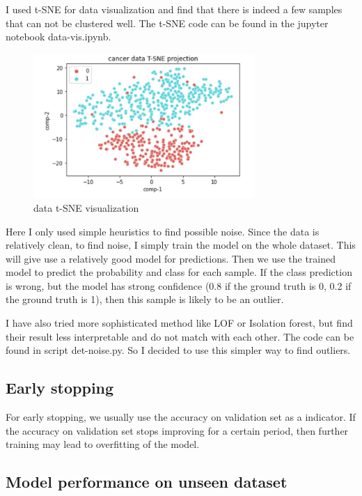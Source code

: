 \documentclass[a4paper, 12pt]{article}
\begin{document}
I used t-SNE for data visualization and find that there is indeed a few samples that can not be clustered well.
The t-SNE code can be found in the jupyter notebook data-vis.ipynb.

\begin{figure}[h]
    \centering
    \includegraphics[width=0.75\textwidth]{data-tsne.jpg}
    \caption{data t-SNE visualization}
\end{figure}

Here I only used simple heuristics to find possible noise.
Since the data is relatively clean, to find noise, I simply train the model on the whole dataset.
This will give use a relatively good model for predictions.
Then we use the trained model to predict the probability and class for each sample.
If the class prediction is wrong, but the model has strong confidence
(0.8 if the ground truth is 0, 0.2 if the ground truth is 1),
then this sample is likely to be an outlier.

I have also tried more sophisticated method like LOF or Isolation forest, but find their result less
interpretable and do not match with each other. The code can be found in script det-noise.py.
So I decided to use this simpler way to find outliers.

\subsection{Early stopping}

For early stopping, we usually use the accuracy on validation set as a indicator.
If the accuracy on validation set stops improving for a certain period,
then further training may lead to overfitting of the model.

\subsection{Model performance on unseen dataset}
\end{document}
